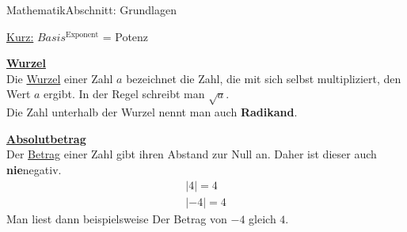 \documentclass[11pt,twocolumn,oneside,openany,headings=optiontotoc,11pt,numbers=noenddot]{article}
\begin{document}
\begin{worksheet}{}{Mathematik}{Abschnitt: Grundlagen}
		\begin{framed}
			\noindent
			\underline{Kurz:} \(Basis^{\text{Exponent}}\) = Potenz
		\end{framed}
		\noindent
		\underline{\textbf{Wurzel}}\\
		Die \underline{Wurzel} einer Zahl \(a\) bezeichnet die Zahl, die mit sich selbst multipliziert, den Wert \(a\) ergibt. In der Regel schreibt man \(\sqrt{a}\).\\
		Die Zahl unterhalb der Wurzel nennt man auch \textbf{Radikand}.\\
		\par\noindent
		\underline{\textbf{Absolutbetrag}}\\
		Der \underline{Betrag} einer Zahl gibt ihren \grqq{}Abstand\grqq{} zur Null an. Daher ist dieser auch \textbf{nie}negativ.
		\begin{align*}
			|4| = 4\\
			|-4| = 4
		\end{align*}
		Man liest dann beispielsweise \glqq{}Der Betrag von \(-4\) gleich \(4\)\grqq{}.

\end{worksheet}
\end{document}
